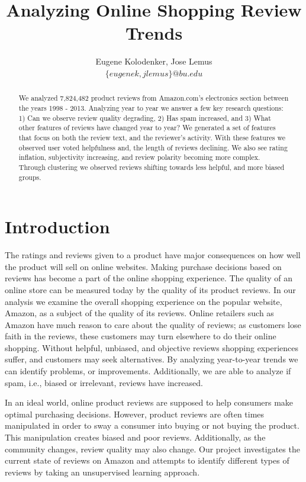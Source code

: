 \documentclass[journal, a4paper]{IEEEtran}
\begin{document}
\title{Analyzing Online Shopping Review Trends}
\author{Eugene Kolodenker, Jose Lemus \\ $\{eugenek, jlemus\}@bu.edu$}
\maketitle

\begin{abstract}
We analyzed 7,824,482 product reviews from Amazon.com's electronics section between the years 1998 - 2013.
Analyzing year to year we answer a few key research questions: 1) Can we observe review quality degrading, 2) Has spam increased, and 3) What other features of reviews have changed year to year? We generated a set of features that focus on both the review text, and the reviewer's activity. With these features we observed user voted helpfulness and, the length of reviews declining. We also see rating inflation, subjectivity increasing, and review polarity becoming more complex. Through clustering we observed reviews shifting towards less helpful, and more biased groups.
\end{abstract}

\section{Introduction}
The ratings and reviews given to a product have major consequences on how well the product will sell on online websites. Making purchase decisions based on reviews has become a part of the online shopping experience. The quality of an online store can be measured today by the quality of its product reviews. In our analysis we examine the overall shopping experience on the popular website, Amazon, as a subject of the quality of its reviews. Online retailers such as Amazon have much reason to care about the quality of reviews; as customers lose faith in the reviews, these customers may turn elsewhere to do their online shopping. Without helpful, unbiased, and objective reviews shopping experiences suffer, and customers may seek alternatives. By analyzing year-to-year trends we can identify problems, or improvements. Additionally, we are able to analyze if spam, i.e., biased or irrelevant, reviews have increased.

In an ideal world, online product reviews are supposed to help consumers make optimal purchasing decisions. However, product reviews are often times manipulated in order to sway a consumer into buying or not buying the product. This manipulation creates biased and poor reviews. Additionally, as the community changes, review quality may also change. Our project investigates the current state of reviews on Amazon and attempts to identify different types of reviews by taking an unsupervised learning approach.
\end{document}
